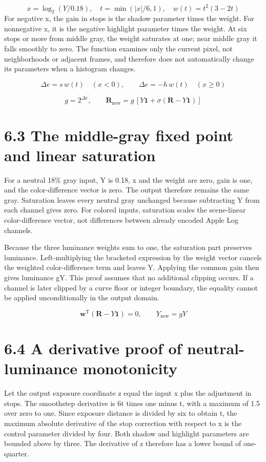 \documentclass[11pt,a4paper,openany]{book}
\begin{document}
\begin{equation}
x=\log_2(Y/0.18),\quad t=\min(|x|/6,1),\quad w(t)=t^2(3-2t)
\end{equation}
For negative x, the gain in stops is the shadow parameter times the weight. For nonnegative x, it is the negative highlight parameter times the weight. At six stops or more from middle gray, the weight saturates at one; near middle gray it falls smoothly to zero. The function examines only the current pixel, not neighborhoods or adjacent frames, and therefore does not automatically change its parameters when a histogram changes.


\begin{equation}
\Delta e=s\,w(t)\quad(x<0),\qquad \Delta e=-h\,w(t)\quad(x\geq0)
\end{equation}

\begin{equation}
g=2^{\Delta e},\qquad \mathbf{R}_{\mathrm{new}}=g\,[Y\mathbf{1}+\sigma(\mathbf{R}-Y\mathbf{1})]
\end{equation}

\section*{6.3 The middle-gray fixed point and linear saturation}
For a neutral 18\% gray input, Y is 0.18, x and the weight are zero, gain is one, and the color-difference vector is zero. The output therefore remains the same gray. Saturation leaves every neutral gray unchanged because subtracting Y from each channel gives zero. For colored inputs, saturation scales the scene-linear color-difference vector, not differences between already encoded Apple Log channels.

Because the three luminance weights sum to one, the saturation part preserves luminance. Left-multiplying the bracketed expression by the weight vector cancels the weighted color-difference term and leaves Y. Applying the common gain then gives luminance gY. This proof assumes that no additional clipping occurs. If a channel is later clipped by a curve floor or integer boundary, the equality cannot be applied unconditionally in the output domain.


\begin{equation}
\mathbf{w}^{\mathsf T}(\mathbf{R}-Y\mathbf{1})=0,\qquad Y_{\mathrm{new}}=gY
\end{equation}

\section*{6.4 A derivative proof of neutral-luminance monotonicity}
Let the output exposure coordinate z equal the input x plus the adjustment in stops. The smoothstep derivative is 6t times one minus t, with a maximum of 1.5 over zero to one. Since exposure distance is divided by six to obtain t, the maximum absolute derivative of the stop correction with respect to x is the control parameter divided by four. Both shadow and highlight parameters are bounded above by three. The derivative of z therefore has a lower bound of one-quarter.
\end{document}
